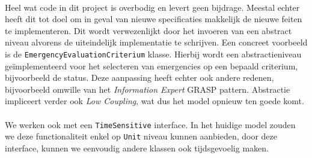 \paragraph{}
Heel wat code in dit project is overbodig en levert geen bijdrage. Meestal echter heeft dit tot doel om in geval van nieuwe specificaties makkelijk de nieuwe feiten te implementeren. Dit wordt verwezenlijkt door het invoeren van een abstract niveau alvorens de uiteindelijk implementatie te schrijven. Een concreet voorbeeld is de \texttt{Emergency\-Evaluation\-Criterium} klasse. Hierbij wordt een abstractieniveau ge\"implementeerd voor het selecteren van emergencies op een bepaald criterium, bijvoorbeeld de status. Deze aanpassing heeft echter ook andere redenen, bijvoorbeeld omwille van het \textit{Information Expert} GRASP pattern. Abstractie impliceert verder ook \textit{Low Coupling}, wat dus het model opnieuw ten goede komt.
\paragraph{}
We werken ook met een \texttt{TimeSensitive} interface. In het huidige model zouden we deze functionaliteit enkel op \texttt{Unit} niveau kunnen aanbieden, door deze interface, kunnen we eenvoudig andere klassen ook tijdsgevoelig maken.